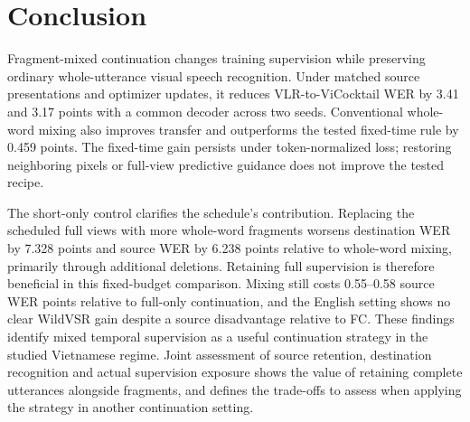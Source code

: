 \section{Conclusion}
Fragment-mixed continuation changes training supervision while preserving
ordinary whole-utterance visual speech recognition. Under matched source
presentations and optimizer updates, it reduces VLR-to-ViCocktail WER by
3.41 and 3.17 points with a common decoder across two seeds. Conventional
whole-word mixing also improves transfer and outperforms the tested fixed-time
rule by 0.459 points. The fixed-time gain persists under token-normalized loss;
restoring neighboring pixels or full-view predictive guidance does not improve
the tested recipe.

The short-only control clarifies the schedule's contribution. Replacing the
scheduled full views with more whole-word fragments worsens destination WER
by 7.328 points and source WER by 6.238 points relative to whole-word mixing,
primarily through additional deletions. Retaining full supervision is therefore
beneficial in this fixed-budget comparison. Mixing still costs 0.55--0.58
source WER points relative to full-only continuation, and the English setting
shows no clear WildVSR gain despite a source disadvantage relative to FC.
These findings identify mixed temporal supervision as a useful continuation
strategy in the studied Vietnamese regime. Joint assessment of source retention,
destination recognition and actual supervision exposure shows the value of
retaining complete utterances alongside fragments, and defines the trade-offs
to assess when applying the strategy in another continuation setting.
